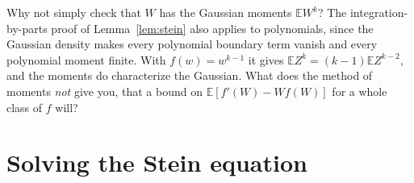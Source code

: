 \begin{think}
Why not simply check that $W$ has the Gaussian moments $\mathbb EW^k$? The integration-by-parts proof of Lemma~\ref{lem:stein} also applies to polynomials, since the Gaussian density makes every polynomial boundary term vanish and every polynomial moment finite. With $f(w)=w^{k-1}$ it gives
$\mathbb EZ^k=(k-1)\mathbb EZ^{k-2}$, and the moments do characterize the Gaussian. What does the method of moments \emph{not} give you, that a bound on
$\mathbb E[f'(W)-Wf(W)]$ for a whole class of $f$ will?
\end{think}

\section{Solving the Stein equation}

